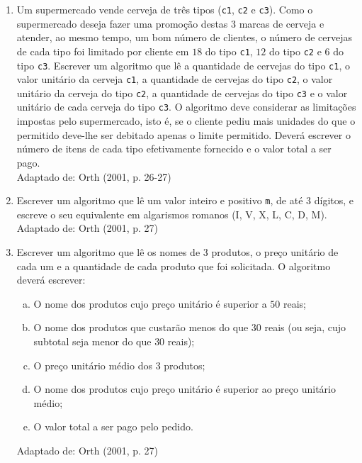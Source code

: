 \documentclass[onecolumn,a4paper,10pt]{report}
\newcommand{\+}{\, + \,}
\newcommand{\<}{\hspace*{-0.4cm}}
\begin{document}
\begin{enumerate}[1.]
\item Um supermercado vende cerveja de três tipos (\texttt{c1}, \texttt{c2} e \texttt{c3}). Como o supermercado deseja fazer uma promoção destas $3$ marcas de cerveja e atender, ao mesmo tempo, um bom número de clientes, o número de cervejas de cada tipo foi limitado por cliente em $18$ do tipo \texttt{c1}, $12$ do tipo \texttt{c2} e $6$ do tipo \texttt{c3}. Escrever um algoritmo que lê a quantidade de cervejas do tipo \texttt{c1}, o valor unitário da cerveja \texttt{c1}, a quantidade de cervejas do tipo \texttt{c2}, o valor unitário da cerveja do tipo \texttt{c2}, a quantidade de cervejas do tipo \texttt{c3} e o valor unitário de cada cerveja do tipo \texttt{c3}. O algoritmo deve considerar as limitações impostas pelo supermercado, isto é, se o cliente pediu mais unidades do que o permitido deve-lhe ser debitado apenas o limite permitido. Deverá escrever o número de itens de cada tipo efetivamente fornecido e o valor total a ser pago.\\
{\tiny Adaptado de: Orth (2001, p. 26-27)}

\item Escrever um algoritmo que lê um valor inteiro e positivo \texttt{m}, de até $3$ dígitos, e escreve o seu equivalente em algarismos romanos (I, V, X, L, C, D, M).\\
{\tiny Adaptado de: Orth (2001, p. 27)}

\item Escrever um algoritmo que lê os nomes de $3$ produtos, o preço unitário de cada um e a quantidade de cada produto que foi solicitada. O algoritmo deverá escrever:
\begin{enumerate}[a)]
    \item O nome dos produtos cujo preço unitário é superior a $50$ reais;
    \item O nome dos produtos que custarão menos do que $30$ reais (ou seja, cujo subtotal seja menor do que $30$ reais);
    \item O preço unitário médio dos $3$ produtos;
    \item O nome dos produtos cujo preço unitário é superior ao preço unitário médio;
    \item O valor total a ser pago pelo pedido.
\end{enumerate}
{\tiny Adaptado de: Orth (2001, p. 27)}

\end{enumerate}

~\\

\end{document}
